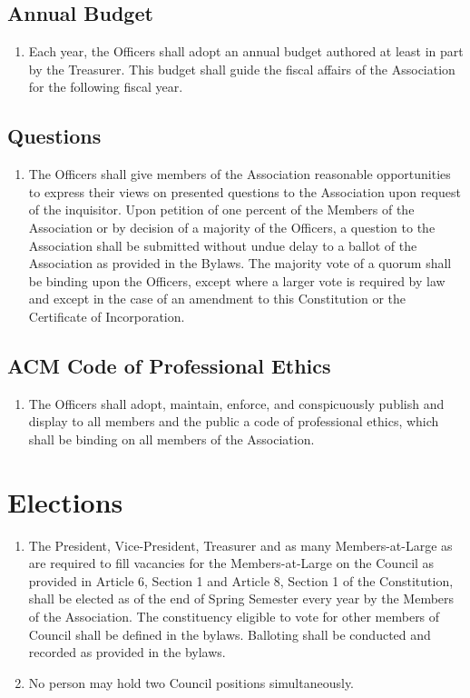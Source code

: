 \subsection{Annual Budget}
\begin{enumerate}
	\item Each year, the Officers shall adopt an annual budget authored at least in part by the Treasurer. This budget shall guide the fiscal affairs of the Association for the following fiscal year.
\end{enumerate}

\subsection{Questions}
\begin{enumerate}
	\item The Officers shall give members of the Association reasonable opportunities to express their views on presented questions to the Association upon request of the inquisitor. Upon petition of one percent of the Members of the Association or by decision of a majority of the Officers, a question to the Association shall be submitted without undue delay to a ballot of the Association as provided in the Bylaws. The majority vote of a quorum shall be binding upon the Officers, except where a larger vote is required by law and except in the case of an amendment to this Constitution or the Certificate of Incorporation.
\end{enumerate}

\subsection{ACM Code of Professional Ethics}
\begin{enumerate}
	\item The Officers shall adopt, maintain, enforce, and conspicuously publish and display to all members and the public a code of professional ethics, which shall be binding on all members of the Association.
\end{enumerate}

\section{Elections}
\begin{enumerate}
	\item The President, Vice-President, Treasurer and as many Members-at-Large as are required to fill vacancies for the Members-at-Large on the Council as provided in Article 6, Section 1 and Article 8, Section 1 of the Constitution, shall be elected as of the end of Spring Semester every year by the Members of the Association. The constituency eligible to vote for other members of Council shall be defined in the bylaws. Balloting shall be conducted and recorded as provided in the bylaws.
	\item No person may hold two Council positions simultaneously.
\end{enumerate}

